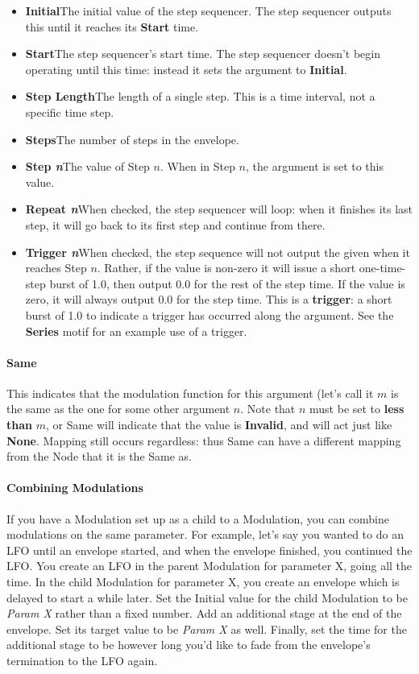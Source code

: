 \documentclass[twoside,10pt]{article}
\begin{document}
\begin{itemize}
\item {\bf Initial}\qquad The initial value of the step sequencer.   The step sequencer outputs this until it reaches its {\bf Start} time.
\item {\bf Start}\qquad The step sequencer's start time.  The step sequencer doesn't begin operating until this time: instead it sets the argument to {\bf Initial}.
\item {\bf Step Length}\qquad The length of a single step.  This is a time interval, not a specific time step.
\item {\bf Steps}\qquad The number of steps in the envelope.
\item {\bf Step \textit{n}}\qquad The value of Step \(n\).  When in Step \(n\), the argument is set to this value.
\item {\bf Repeat \textit{n}}\qquad When checked, the step sequencer will loop: when it finishes its last step, it will go back to its first step and continue from there.
\item {\bf Trigger \textit{n}}\qquad When checked, the step sequence will not output the given when it reaches Step \(n\).  Rather, if the value is non-zero it will issue a short one-time-step burst of 1.0, then output 0.0 for the rest of the step time.  If the value is zero, it will always output 0.0 for the step time.  This is a {\bf trigger}: a short burst of 1.0 to indicate a trigger has occurred along the argument.  See the {\bf Series} motif for an example use of a trigger.
\end{itemize}

\paragraph{Same}

This indicates that the modulation function for this argument (let's call it \(m\) is the same as the one for some other argument \(n\). Note that \(n\) must be set to {\bf less than} \(m\), or Same will indicate that the value is {\bf Invalid}, and will act just like {\bf None}.  Mapping still occurs regardless: thus Same can have a different mapping from the Node that it is the Same as.

\paragraph{Combining Modulations}

If you have a Modulation set up as a child to a Modulation, you can combine modulations on the same parameter.  For example, let's say you wanted to do an LFO until an envelope started, and when the envelope finished, you continued the LFO.  You create an LFO in the parent Modulation for parameter X, going all the time.  In the child Modulation for parameter X, you create an envelope which is delayed to start a while later.  Set the Initial value for the child Modulation to be {\it Param X} rather than a fixed number.  Add an additional stage at the end of the envelope.  Set its target value to be {\it Param X} as well.  Finally, set the time for the additional stage to be however long you'd like to fade from the envelope's termination to the LFO again.
\end{document}
